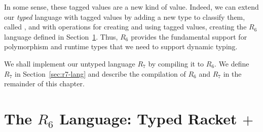 \documentclass[11pt]{book}
\begin{document}
In some sense, these tagged values are a new kind of value.  Indeed,
we can extend our \emph{typed} language with tagged values by adding a
new type to classify them, called , and with operations for
creating and using tagged values, creating the $R_6$ language defined
in Section~\ref{sec:r6-lang}. Thus, $R_6$ provides the fundamental
support for polymorphism and runtime types that we need to support
dynamic typing.

We shall implement our untyped language $R_7$ by compiling it to
$R_6$. We define $R_7$ in Section~\ref{sec:r7-lang} and describe the
compilation of $R_6$ and $R_7$ in the remainder of this chapter.

\section{The $R_6$ Language: Typed Racket $+$ }
\label{sec:r6-lang}
\end{document}

